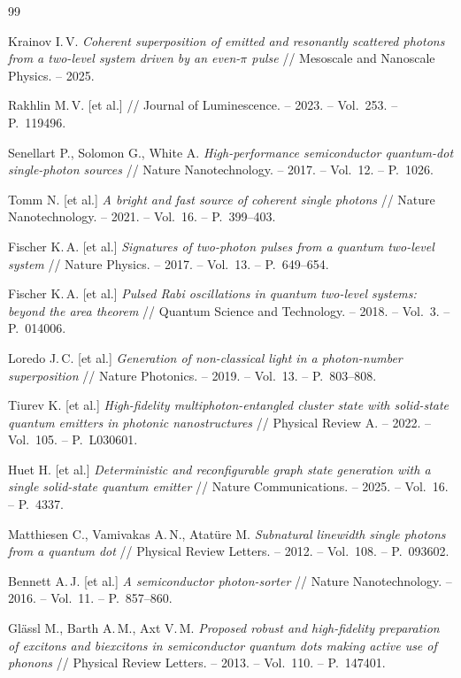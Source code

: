 \documentclass[11pt]{article}    %
\numberwithin{equation}{section}
\begin{document}
\begin{thebibliography}{99}

Krainov I.\,V. \textit{Coherent superposition of emitted and resonantly scattered photons from a two-level system driven by an even-$\pi$ pulse} // Mesoscale and Nanoscale Physics. -- 2025.

Rakhlin M.\,V. [et al.] // Journal of Luminescence. -- 2023. -- Vol.~253. -- P.~119496.

Senellart P., Solomon G., White A. \textit{High-performance semiconductor quantum-dot single-photon sources} // Nature Nanotechnology. -- 2017. -- Vol.~12. -- P.~1026.

Tomm N. [et al.] \textit{A bright and fast source of coherent single photons} // Nature Nanotechnology. -- 2021. -- Vol.~16. -- P.~399--403.

Fischer K.\,A. [et al.] \textit{Signatures of two-photon pulses from a quantum two-level system} // Nature Physics. -- 2017. -- Vol.~13. -- P.~649--654.

Fischer K.\,A. [et al.] \textit{Pulsed Rabi oscillations in quantum two-level systems: beyond the area theorem} // Quantum Science and Technology. -- 2018. -- Vol.~3. -- P.~014006.

Loredo J.\,C. [et al.] \textit{Generation of non-classical light in a photon-number superposition} // Nature Photonics. -- 2019. -- Vol.~13. -- P.~803--808.

Tiurev K. [et al.] \textit{High-fidelity multiphoton-entangled cluster state with solid-state quantum emitters in photonic nanostructures} // Physical Review A. -- 2022. -- Vol.~105. -- P.~L030601.

Huet H. [et al.] \textit{Deterministic and reconfigurable graph state generation with a single solid-state quantum emitter} // Nature Communications. -- 2025. -- Vol.~16. -- P.~4337.

Matthiesen C., Vamivakas A.\,N., Atat\"ure M. \textit{Subnatural linewidth single photons from a quantum dot} // Physical Review Letters. -- 2012. -- Vol.~108. -- P.~093602.

Bennett A.\,J. [et al.] \textit{A semiconductor photon-sorter} // Nature Nanotechnology. -- 2016. -- Vol.~11. -- P.~857--860.

Gl\"assl M., Barth A.\,M., Axt V.\,M. \textit{Proposed robust and high-fidelity preparation of excitons and biexcitons in semiconductor quantum dots making active use of phonons} // Physical Review Letters. -- 2013. -- Vol.~110. -- P.~147401.


\end{thebibliography}
\end{document}

